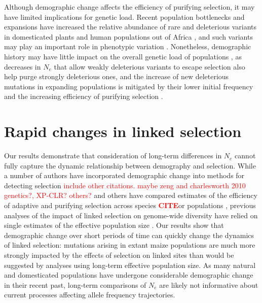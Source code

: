 \documentclass{pnastwo}
\newcommand{\jri}[1]{\textcolor{red}{\scriptsize #1}}
\newcommand{\citex}{\textcolor{red}{\bf CITE}}
\begin{document}
\begin{article}
Although demographic change affects the efficiency of purifying selection, it may have limited implications for genetic load. 
Recent population bottlenecks and expansions have increased the relative abundance of rare and 
deleterious variants in domesticated plants \cite{Gunther:2010gt,renaut2015} and human populations out of Africa \cite{keinan2012,coventry2010}, and such variants may play an important role in phenotypic variation \cite{Mezmouk:2014es, coventry2010, eyre2010}.
Nonetheless, demographic history may have little impact on the overall genetic load of populations \cite{do2015,simons2014}, as decreases in $N_e$ that allow weakly deleterious variants to escape selection also help purge strongly deleterious ones, and the increase of new deleterious mutations in expanding populations is mitigated by their lower initial frequency and the increasing efficiency of purifying selection \cite{gazave2013, simons2014, lohmueller2014}. 

\section{Rapid changes in linked selection} %
Our results demonstrate that consideration of long-term differences in $N_e$ cannot fully capture the dynamic relationship between demography and selection. 
While a number of authors have incorporated demographic change into methods for detecting selection \cite{eyre2009estimating} \jri{include other citations. maybe zeng and charlesworth 2010 genetics?, XP-CLR? others?} and others have compared estimates of the efficiency of adaptive and purifying selection across species \citex or populations \cite{Elyashiv:2010ga}, previous analyses of the impact of linked selection on genome-wide diversity have relied on single estimates of the effective population size \cite{corbett2015,leffler2012}.
Our results show that demographic change over short periods of time can quickly change the dynamics of linked selection: mutations arising in extant maize populations are much more strongly impacted by the effects of selection on linked sites than would be suggested by analyses using long-term effective population size.
As many natural and domesticated populations have undergone considerable demographic change in their recent past, long-term comparisons of $N_e$ are likely not informative about current processes affecting allele frequency trajectories.

\begin{materials} %


\end{materials}
\end{article}
\end{document}
